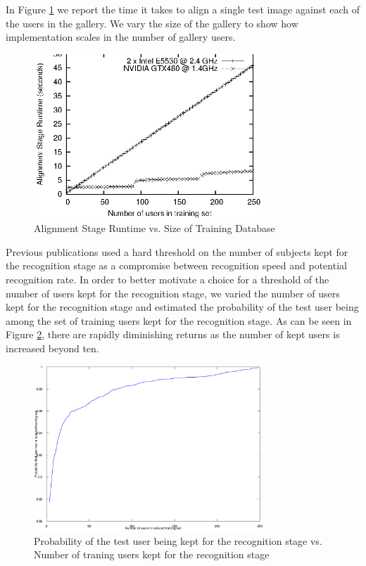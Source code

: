 \documentclass[10pt,twocolumn,letterpaper]{article}
\begin{document}
In Figure \ref{fig:alignment_stage_runtime} we report the time it takes
to align a single test image against each of the users in the gallery.
We vary the size of the gallery to show how implementation scales in the
number of gallery users.
\begin{figure}
\centering
\includegraphics[width=3.4in]{figures/alignment_runtime_graph}
\caption{Alignment Stage Runtime vs. Size of Training Database}
\label{fig:alignment_stage_runtime}
\end{figure}

Previous publications used a hard threshold on the number of subjects kept for the recognition
stage as a compromise between recognition speed and potential recognition rate.
In order to better motivate 
a choice for a threshold of the number of users kept for the recognition stage,
we varied the number of users kept for the recognition stage and estimated the probability
of the test user being among the set of training users kept for the recognition stage.
As can be seen in Figure \ref{fig:user_alignment_rank_plot}, there are rapidly diminishing
returns as the number of kept users is increased beyond ten.  
\begin{figure}
\centering
\includegraphics[width=3.4in]{figures/user_alignment_rank_plot}
\caption{Probability of the test user being kept for the recognition stage vs. Number of traning
users kept for the recognition stage}
\label{fig:user_alignment_rank_plot}
\end{figure}
\end{document}
